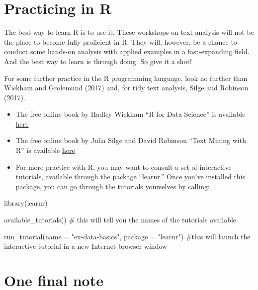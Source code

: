 \documentclass[
  letterpaper,
  DIV=11,
  numbers=noendperiod]{scrreprt}
\newenvironment{Shaded}{\begin{snugshade}}{\end{snugshade}}
\newcommand{\AttributeTok}[1]{\textcolor[rgb]{0.40,0.45,0.13}{#1}}
\newcommand{\CommentTok}[1]{\textcolor[rgb]{0.37,0.37,0.37}{#1}}
\newcommand{\FunctionTok}[1]{\textcolor[rgb]{0.28,0.35,0.67}{#1}}
\newcommand{\NormalTok}[1]{\textcolor[rgb]{0.00,0.23,0.31}{#1}}
\newcommand{\StringTok}[1]{\textcolor[rgb]{0.13,0.47,0.30}{#1}}
\begin{document}
\hypertarget{practicing-in-r}{%
\section*{Practicing in R}\label{practicing-in-r}}

The best way to learn R is to use it. These workshops on text analysis
will not be the place to become fully proficient in R. They will,
however, be a chance to conduct some hands-on analysis with applied
examples in a fast-expanding field. And the best way to learn is through
doing. So give it a shot!

For some further practice in the R programming language, look no further
than Wickham and Grolemund (2017) and, for tidy text analysis, Silge and
Robinson (2017).

\begin{itemize}
\item
  The free online book by Hadley Wickham ``R for Data Science'' is
  available \href{https://r4ds.had.co.nz/}{here}
\item
  The free online book by Julia Silge and David Robinson ``Text Mining
  with R'' is available \href{https://www.tidytextmining.com/}{here}
\item
  For more practice with R, you may want to consult a set of interactive
  tutorials, available through the package ``learnr.'' Once you've
  installed this package, you can go through the tutorials yourselves by
  calling:
\end{itemize}

\begin{Shaded}
\begin{Highlighting}[]
\FunctionTok{library}\NormalTok{(learnr)}

\FunctionTok{available\_tutorials}\NormalTok{() }\CommentTok{\# this will tell you the names of the tutorials available}

\FunctionTok{run\_tutorial}\NormalTok{(}\AttributeTok{name =} \StringTok{"ex{-}data{-}basics"}\NormalTok{, }\AttributeTok{package =} \StringTok{"learnr"}\NormalTok{) }\CommentTok{\#this will launch the interactive tutorial in a new Internet browser window}
\end{Highlighting}
\end{Shaded}

\hypertarget{one-final-note}{%
\section*{One final note}\label{one-final-note}}
\end{document}
